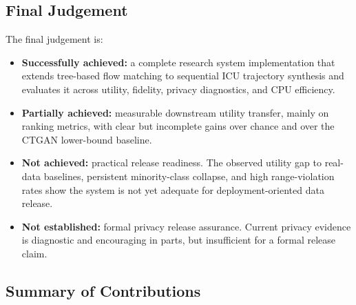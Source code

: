 \subsection{Final Judgement}

The final judgement is:
\begin{itemize}\tightlist
    \item \textbf{Successfully achieved:} a complete research system implementation that extends tree-based flow matching to sequential ICU trajectory synthesis and evaluates it across utility, fidelity, privacy diagnostics, and CPU efficiency.
    \item \textbf{Partially achieved:} measurable downstream utility transfer, mainly on ranking metrics, with clear but incomplete gains over chance and over the CTGAN lower-bound baseline.
    \item \textbf{Not achieved:} practical release readiness. The observed utility gap to real-data baselines, persistent minority-class collapse, and high range-violation rates show the system is not yet adequate for deployment-oriented data release.
    \item \textbf{Not established:} formal privacy release assurance. Current privacy evidence is diagnostic and encouraging in parts, but insufficient for a formal release claim.
\end{itemize}

\subsection{Summary of Contributions}

